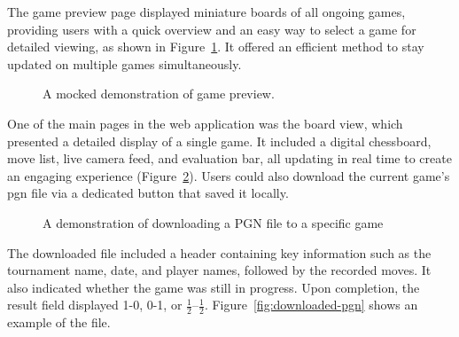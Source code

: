 The game preview page displayed miniature boards of all ongoing games, providing users with a quick overview and an easy way to select a game for detailed viewing, as shown in Figure~\ref{fig:game-preview}. It offered an efficient method to stay updated on multiple games simultaneously.

\begin{figure}[h!] \centering {}\caption[Display of game preview]{A mocked demonstration of game preview.}\label{fig:game-preview} \end{figure}

One of the main pages in the web application was the board view, which presented a detailed display of a single game. It included a digital chessboard, move list, live camera feed, and evaluation bar, all updating in real time to create an engaging experience (Figure~\ref{fig:download-pgn}). Users could also download the current game's \gls{pgn} file via a dedicated button that saved it locally. \\

\begin{figure}[h!] \centering {}\caption[Display of board view]{A demonstration of downloading a PGN file to a specific game}\label{fig:download-pgn} \end{figure}

The downloaded file included a header containing key information such as the tournament name, date, and player names, followed by the recorded moves. It also indicated whether the game was still in progress. Upon completion, the result field displayed 1-0, 0-1, or $\frac{1}{2}$–$\frac{1}{2}$. Figure~\ref{fig:downloaded-pgn} shows an example of the file. \\

